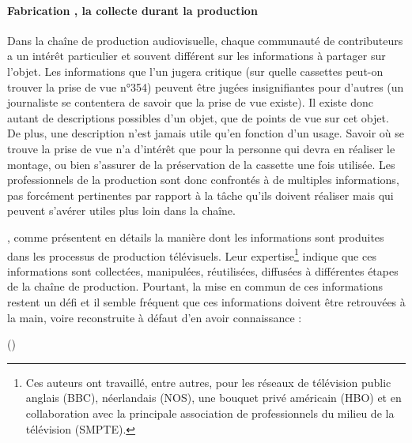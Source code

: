 \paragraph{Fabrication , la collecte durant la production}
Dans la chaîne de production audiovisuelle, chaque communauté de contributeurs a un intérêt particulier et souvent différent sur les informations à partager sur l'objet. 
Les informations que l'un jugera critique (sur quelle cassettes peut-on trouver la prise de vue n°354) peuvent être jugées insignifiantes pour d'autres (un journaliste se contentera de savoir que la prise de vue existe). 
Il existe donc autant de descriptions possibles d'un objet, que de points de vue sur cet objet. 
De plus, une description n'est jamais utile qu'en fonction d'un usage. 
Savoir où se trouve la prise de vue n'a d'intérêt que pour la personne qui devra en réaliser le montage, ou bien s'assurer de la préservation de la cassette une fois utilisée. 
Les professionnels de la production sont donc confrontés à de multiples informations, pas forcément pertinentes par rapport à la tâche qu'ils doivent réaliser mais qui peuvent s'avérer utiles plus loin dans la chaîne.  

\citeauthor{Rayers2002}, comme \citeauthor{Austerberry2004} présentent en détails la manière dont les informations sont produites dans les processus de production télévisuels. 
Leur expertise\footnote{Ces auteurs ont travaillé, entre autres, pour les réseaux de télévision public anglais (BBC), néerlandais (NOS), une bouquet privé américain (HBO) et en collaboration avec la principale association de professionnels du milieu de la télévision (SMPTE).} indique que ces informations sont collectées, manipulées,  réutilisées, diffusées à différentes étapes de la chaîne de production. 
Pourtant, la mise en commun de ces informations restent un défi et il semble fréquent que ces informations doivent être retrouvées à la main, voire reconstruite à défaut d'en avoir connaissance :

 (\cite[p.22, Metadata in the Workflow]{Austerberry2004})

